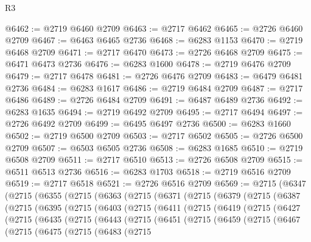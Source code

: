 \begin{lexlean}{R3}
\begin{coremodule}
@6462 := @2719 @6460 @2709
@6463 := @2717 @6462
@6465 := @2726 @6460 @2709
@6467 := @6463 @6465 @2736
@6468 := @6283 @1153
@6470 := @2719 @6468 @2709
@6471 := @2717 @6470
@6473 := @2726 @6468 @2709
@6475 := @6471 @6473 @2736
@6476 := @6283 @1600
@6478 := @2719 @6476 @2709
@6479 := @2717 @6478
@6481 := @2726 @6476 @2709
@6483 := @6479 @6481 @2736
@6484 := @6283 @1617
@6486 := @2719 @6484 @2709
@6487 := @2717 @6486
@6489 := @2726 @6484 @2709
@6491 := @6487 @6489 @2736
@6492 := @6283 @1635
@6494 := @2719 @6492 @2709
@6495 := @2717 @6494
@6497 := @2726 @6492 @2709
@6499 := @6495 @6497 @2736
@6500 := @6283 @1660
@6502 := @2719 @6500 @2709
@6503 := @2717 @6502
@6505 := @2726 @6500 @2709
@6507 := @6503 @6505 @2736
@6508 := @6283 @1685
@6510 := @2719 @6508 @2709
@6511 := @2717 @6510
@6513 := @2726 @6508 @2709
@6515 := @6511 @6513 @2736
@6516 := @6283 @1703
@6518 := @2719 @6516 @2709
@6519 := @2717 @6518
@6521 := @2726 @6516 @2709
@6569 := @2715
    (@6347
      (@2715
        (@6355
          (@2715
            (@6363
              (@2715
                (@6371
                  (@2715
                    (@6379
                      (@2715
                        (@6387
                          (@2715
                            (@6395
                              (@2715
                                (@6403
                                  (@2715
                                    (@6411
                                      (@2715
                                        (@6419
                                          (@2715
                                            (@6427
                                              (@2715
                                                (@6435
                                                  (@2715
                                                    (@6443
                                                      (@2715
                                                        (@6451
                                                          (@2715
                                                            (@6459
                                                              (@2715
                                                                (@6467
                                                                  (@2715
                                                                    (@6475
                                                                      (@2715
                                                                        (@6483
                                                                          (@2715

\end{coremodule}
\end{lexlean}
